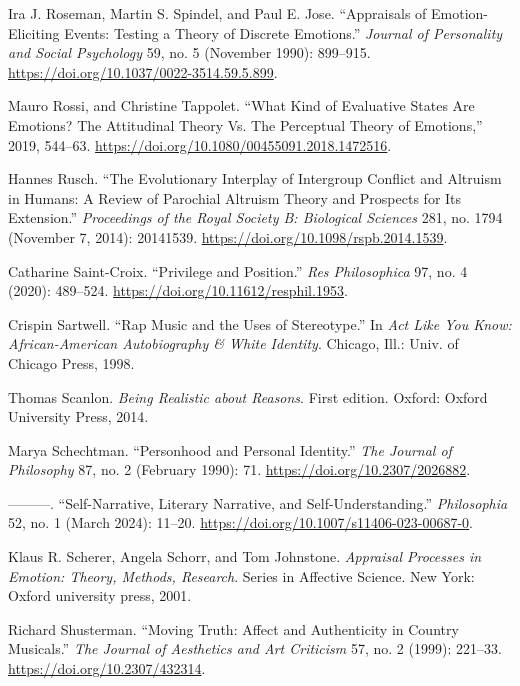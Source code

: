 \documentclass[phdthesis,12pt,final,a4paper]{wuthesis}
\newlength{\cslhangindent}
\newenvironment{CSLReferences}[2] %
{\begin{list}{}{%
	\setlength{\itemindent}{0pt}
	\setlength{\leftmargin}{0pt}
	\setlength{\parsep}{0pt}
	\ifodd #1
	\setlength{\leftmargin}{\cslhangindent}
	\setlength{\itemindent}{-1\cslhangindent}
	\fi
	\setlength{\itemsep}{#2\baselineskip}}}
{\end{list}}
\theoremstyle{definition}
\theoremstyle{definition}
\theoremstyle{definition}
\theoremstyle{definition}
\theoremstyle{remark}
\begin{document}
\begin{CSLReferences}{1}{0}
Ira J. Roseman, Martin S. Spindel, and Paul E. Jose. {``Appraisals of Emotion-Eliciting Events: {Testing} a Theory of Discrete Emotions.''} \emph{Journal of Personality and Social Psychology} 59, no. 5 (November 1990): 899--915. \url{https://doi.org/10.1037/0022-3514.59.5.899}.

Mauro Rossi, and Christine Tappolet. {``What {Kind} of {Evaluative States Are Emotions}? {The Attitudinal Theory Vs}. {The Perceptual Theory} of {Emotions},''} 2019, 544--63. \url{https://doi.org/10.1080/00455091.2018.1472516}.

Hannes Rusch. {``The Evolutionary Interplay of Intergroup Conflict and Altruism in Humans: A Review of Parochial Altruism Theory and Prospects for Its Extension.''} \emph{Proceedings of the Royal Society B: Biological Sciences} 281, no. 1794 (November 7, 2014): 20141539. \url{https://doi.org/10.1098/rspb.2014.1539}.

Catharine Saint-Croix. {``Privilege and {Position}.''} \emph{Res Philosophica} 97, no. 4 (2020): 489--524. \url{https://doi.org/10.11612/resphil.1953}.

Crispin Sartwell. {``Rap {Music} and the {Uses} of {Stereotype}.''} In \emph{Act Like You Know: {African-American} Autobiography \& White Identity}. Chicago, Ill.: Univ. of Chicago Press, 1998.

Thomas Scanlon. \emph{Being Realistic about Reasons}. First edition. Oxford: Oxford University Press, 2014.

Marya Schechtman. {``Personhood and {Personal Identity}.''} \emph{The Journal of Philosophy} 87, no. 2 (February 1990): 71. \url{https://doi.org/10.2307/2026882}.

---------. {``Self-{Narrative}, {Literary Narrative}, and {Self-Understanding}.''} \emph{Philosophia} 52, no. 1 (March 2024): 11--20. \url{https://doi.org/10.1007/s11406-023-00687-0}.

Klaus R. Scherer, Angela Schorr, and Tom Johnstone. \emph{Appraisal Processes in Emotion: Theory, Methods, Research}. Series in Affective Science. New York: Oxford university press, 2001.

Richard Shusterman. {``Moving {Truth}: {Affect} and {Authenticity} in {Country Musicals}.''} \emph{The Journal of Aesthetics and Art Criticism} 57, no. 2 (1999): 221--33. \url{https://doi.org/10.2307/432314}.


\end{CSLReferences}
\end{document}
